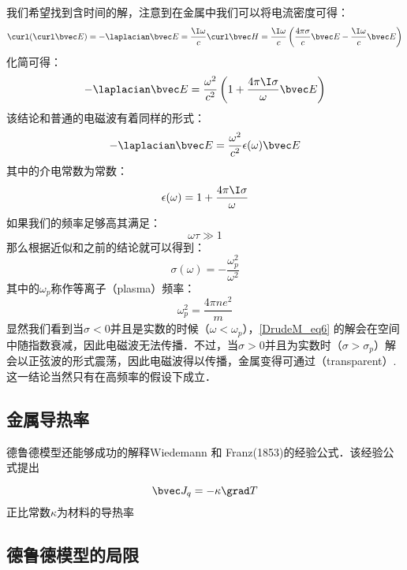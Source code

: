 我们希望找到含时间的解，注意到在金属中我们可以将电流密度可得：
\begin{equation}
\curl(\curl\bvec E)=-\laplacian \bvec E =\frac{\I\omega}{c}\curl\bvec H=\frac{\I\omega}{c}\left(\frac{4\pi\sigma}{c}\bvec E-\frac{\I\omega}{c}\bvec E\right)
\end{equation}
化简可得：
\begin{equation}
-\laplacian \bvec E =\frac{\omega^2}{c^2}\left(1+\frac{4\pi\I\sigma}{\omega}\bvec E\right)
\end{equation}
该结论和普通的电磁波有着同样的形式：
\begin{equation}\label{DrudeM_eq6}
-\laplacian \bvec E = \frac{\omega^2}{c^2}\epsilon(\omega)\bvec E
\end{equation}
其中的介电常数为常数：
\begin{equation}
\epsilon(\omega)=1+\frac{4\pi\I\sigma}{\omega}
\end{equation}
如果我们的频率足够高其满足：
\begin{equation}
\omega\tau\gg 1
\end{equation}
那么根据近似和之前的结论就可以得到：
\begin{equation}
\sigma(\omega)=-\frac{\omega_p^2}{\omega^2}
\end{equation}
其中的$\omega_p$称作等离子（plasma）频率：
\begin{equation}
\omega_p^2=\frac{4\pi ne^2}{m}
\end{equation}
显然我们看到当$\sigma<0$并且是实数的时候（$\omega<\omega_p$），\autoref{DrudeM_eq6} 的解会在空间中随指数衰减，因此电磁波无法传播．不过，当$\sigma>0$并且为实数时（$\sigma>\sigma_p$）解会以正弦波的形式震荡，因此电磁波得以传播，金属变得可通过（transparent）.这一结论当然只有在高频率的假设下成立．

\subsection{金属导热率}
德鲁德模型还能够成功的解释Wiedemann 和 Franz(1853)的经验公式．该经验公式提出

\begin{equation}
\bvec J_q =-\kappa\grad T
\end{equation}
正比常数$\kappa$为材料的导热率
\subsection{德鲁德模型的局限}

